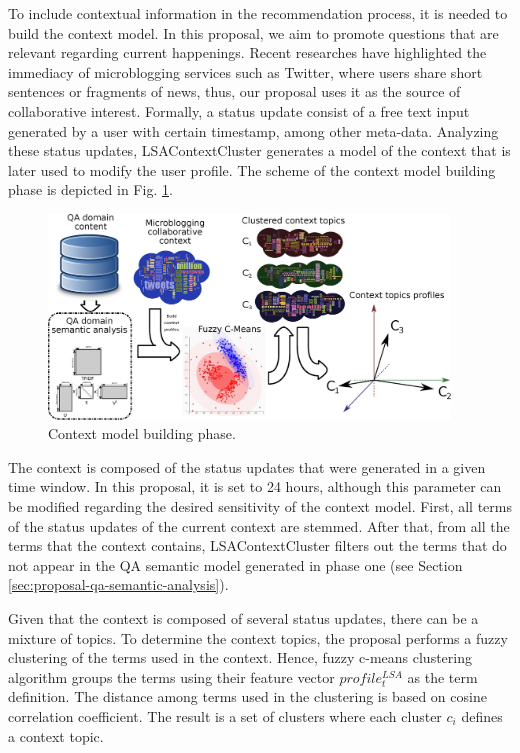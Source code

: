 \documentclass[preprint]{elsarticle}
\begin{document}
\begin{spacing}{1.5}
To include contextual information in the recommendation process, it is needed to build the context model. In this proposal, we aim to promote questions that are relevant regarding current happenings. Recent researches \cite{Hermida2010} have highlighted the immediacy of microblogging services such as Twitter, where users share short sentences or fragments of news, thus, our proposal uses it as the source of collaborative interest. Formally, a status update consist of a free text input generated by a user with certain timestamp, among other meta-data. Analyzing these status updates, LSAContextCluster generates a model of the context that is later used to modify the user profile. 
The scheme of the context model building phase is depicted in Fig. \ref{fig:proposal-context-clustering-phase}.
\begin{figure}[h]
	\centering
	\includegraphics[width=0.95\textwidth]{figures/clustering-phase.eps}
	\caption{Context model building phase.}
	\label{fig:proposal-context-clustering-phase}
\end{figure}

The context is composed of the status updates that were generated in a given time window. In this proposal, it is set to 24 hours, although this parameter can be modified regarding the desired sensitivity of the context model. First, all terms of the status updates of the current context are stemmed. After that, from all the terms that the context contains, LSAContextCluster filters out the terms that do not appear in the QA semantic model generated in phase one (see Section \ref{sec:proposal-qa-semantic-analysis}).

Given that the context is composed of several status updates, there can be a mixture of topics. To determine the context topics, the proposal performs a fuzzy clustering of the terms used in the context. Hence, fuzzy c-means clustering algorithm \cite{Bezdek1984} groups the terms using their feature vector $profile^{LSA}_t$ as the term definition. The distance among terms used in the clustering is based on cosine correlation coefficient. The result is a set of clusters where each cluster  $c_i$ defines a context topic.


\end{spacing}
\end{document}
